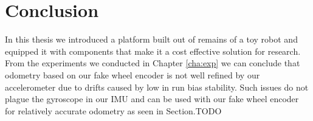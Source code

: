 \documentclass[class=article, crop=false]{standalone}
\begin{document}
\chapter{Conclusion}\label{cha:conclusion}

In this thesis we introduced a platform built out of remains of a toy robot and equipped it with components that make it a cost effective solution for research.
From the experiments we conducted in Chapter \ref{cha:exp} we can conclude that odometry based on our fake wheel encoder is not well refined by our accelerometer due to drifts caused by low in run bias stability. Such issues do not plague the gyroscope in our IMU and can be used with our fake wheel encoder for relatively accurate odometry as seen in Section.TODO
\end{document}
